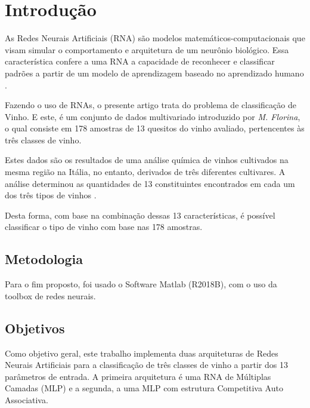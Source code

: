 
\section{Introdução} \label{introducao}

As Redes Neurais Artificiais (RNA) são modelos matemáticos-computacionais que visam simular o comportamento e arquitetura de um neurônio biológico. Essa característica confere a uma RNA a capacidade de reconhecer e classificar padrões a partir de um modelo de aprendizagem baseado no aprendizado humano \cite{kovacs2002redes}.

Fazendo o uso de RNAs, o presente artigo trata do problema de classificação de Vinho. E este, é um conjunto de dados multivariado introduzido por \textit{M. Florina}, o qual consiste em 178 amostras de 13 quesitos do vinho avaliado, pertencentes às três classes de vinho.

Estes dados são os resultados de uma análise química de vinhos cultivados na mesma região na Itália, no entanto, derivados de três diferentes cultivares. A análise determinou as quantidades de 13 constituintes encontrados em cada um dos três tipos de vinhos \cite{fraley2007model}.

Desta forma, com base na combinação dessas 13 características, é possível classificar o tipo de vinho com base nas 178 amostras.

\subsection{Metodologia}

Para o fim proposto, foi usado o Software Matlab (R2018B), com o uso da toolbox de redes neurais.


\subsection{Objetivos}

Como objetivo geral, este trabalho implementa duas arquiteturas de Redes Neurais Artificiais para a classificação de três classes de vinho a partir dos 13 parâmetros de entrada. A primeira arquitetura é uma RNA de Múltiplas Camadas (MLP) e a segunda, a uma MLP com estrutura Competitiva Auto Associativa.

